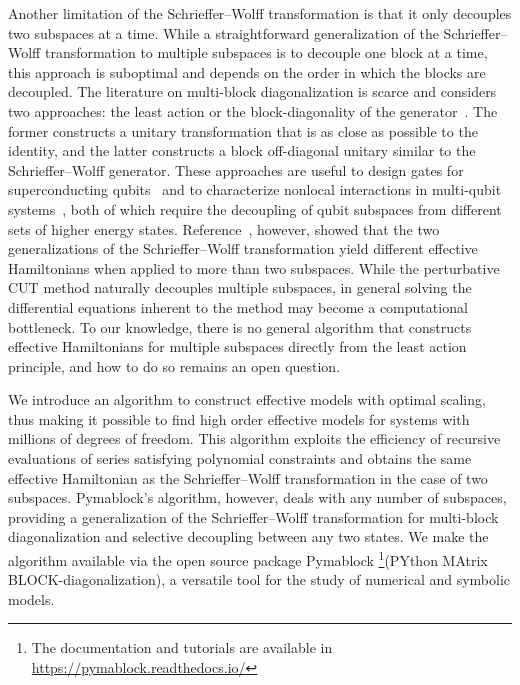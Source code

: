 Another limitation of the Schrieffer--Wolff transformation is that it only decouples two subspaces at a time.
While a straightforward generalization of the Schrieffer--Wolff transformation to multiple subspaces is to decouple one block at a time, this approach is suboptimal and depends on the order in which the blocks are decoupled.
The literature on multi-block diagonalization is scarce and considers two approaches: the least action or the block-diagonality of the generator~\cite{Mankodi_2024}.
The former constructs a unitary transformation that is as close as possible to the identity, and the latter constructs a block off-diagonal unitary similar to the Schrieffer--Wolff generator.
These approaches are useful to design gates for superconducting qubits~\cite{Magesan_2020} and to characterize nonlocal interactions in multi-qubit systems~\cite{Xu_2024a}, both of which require the decoupling of qubit subspaces from different sets of higher energy states.
Reference~\cite{Mankodi_2024}, however, showed that the two generalizations of the Schrieffer--Wolff transformation yield different effective Hamiltonians when applied to more than two subspaces.
While the perturbative CUT method naturally decouples multiple subspaces, in general solving the differential equations inherent to the method may become a computational bottleneck.
To our knowledge, there is no general algorithm that constructs effective Hamiltonians for multiple subspaces directly from the least action principle, and how to do so remains an open question.

We introduce an algorithm to construct effective models with optimal scaling, thus making it possible to find high order effective models for systems with millions of degrees of freedom.
This algorithm exploits the efficiency of recursive evaluations of series satisfying polynomial constraints and obtains the same effective Hamiltonian as the Schrieffer--Wolff transformation in the case of two subspaces.
Pymablock's algorithm, however, deals with any number of subspaces, providing a generalization of the Schrieffer--Wolff transformation for multi-block diagonalization and selective decoupling between any two states.
We make the algorithm available via the open source package Pymablock \footnote{The documentation and tutorials are available in \url{https://pymablock.readthedocs.io/}}(PYthon MAtrix BLOCK-diagonalization), a versatile tool for the study of numerical and symbolic models.
